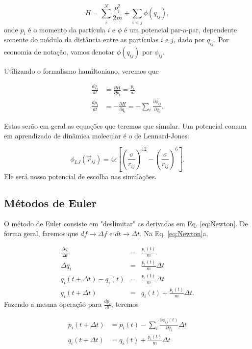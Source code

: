 \documentclass[twoside, a4paper]{scrartcl}
\newcommand{\phiij}{\phi_{ij}}
\newcommand{\del}[2]{\frac{\partial #1}{\partial #2}}
\newcommand{\deri}[2]{\frac{d #1}{d #2}}
\begin{document}
\begin{equation}
	H = \sum_i^N \frac{p_i^2}{2m} + \sum_{i<j} \phi(q_{ij}),
\end{equation}
onde $p_i$ é o momento da partícula $i$ e $\phi$ é um potencial par-a-par, dependente somente do módulo da distância entre as partículas $i$ e $j$, dado por $q_{ij}$. Por economia de notação, vamos denotar $\phi(q_{ij})$ por $\phiij$. 

Utilizando o formalismo hamiltoniano, veremos que 

\begin{subequations}
	\begin{align}
	\deri{q_i}{t} &=  \del{H}{p_i} = \frac{p_i}{m} \\
	\deri{p_i}{t} &= -\del{H}{q_i} = -\sum_i \del{\phiij}{q_i}.
	\end{align}
	\label{eq:Newton}
\end{subequations}

Estas serão em geral as equações que teremos que simular. Um potencial comum em aprendizado de dinâmica molecular é o de Lennard-Jones:

\begin{equation}
	\phi_{LJ}(\vec{r}_{ij}) = 4\epsilon\left[ \left(\frac{\sigma}{r_{ij}}\right)^{12} -  \left(\frac{\sigma}{r_{ij}}\right)^{6} \right].
\end{equation}
Ele será nosso potencial de escolha nas simulações.

\subsection{Métodos de Euler}

O método de Euler consiste em "deslimitar" as derivadas em Eq. \ref{eq:Newton}. De forma geral, faremos que $df \rightarrow \Delta f$ e  $dt \rightarrow \Delta t$. Na Eq. \ref{eq:Newton}a,

\begin{eqnarray*}
	\frac{\Delta q_i}{\Delta t} &=& \frac{p_i(t)}{m} \\
	\Delta q_i &=& \frac{p_i(t)}{m} \Delta t \\
	q_i(t+\Delta t) - q_i(t) &=& \frac{p_i(t)}{m} \Delta t \\
	q_i(t+\Delta t) &=& q_i(t) + \frac{p_i(t)}{m} \Delta t.
\end{eqnarray*}
Fazendo a mesma operação para $\deri{p_i}{t}$, teremos

\begin{subequations}
	\begin{align}
		p_i(t+\Delta t) &= p_i(t) -\sum_i \del{\phiij(t)}{q_i} \Delta t \\
		q_i(t+\Delta t) &= q_i(t) + \frac{p_i(t)}{m} \Delta t
	\end{align}
	\label{eq:Euler_Simples}
\end{subequations}
\end{document}

